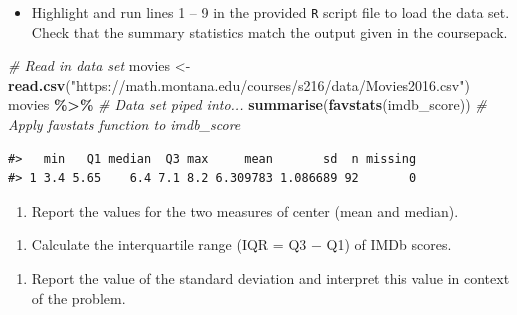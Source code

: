 \documentclass[
]{report}
\newenvironment{Shaded}{\begin{snugshade}}{\end{snugshade}}
\newcommand{\CommentTok}[1]{\textcolor[rgb]{0.56,0.35,0.01}{\textit{#1}}}
\newcommand{\FunctionTok}[1]{\textcolor[rgb]{0.13,0.29,0.53}{\textbf{#1}}}
\newcommand{\NormalTok}[1]{#1}
\newcommand{\OtherTok}[1]{\textcolor[rgb]{0.56,0.35,0.01}{#1}}
\newcommand{\SpecialCharTok}[1]{\textcolor[rgb]{0.81,0.36,0.00}{\textbf{#1}}}
\newcommand{\StringTok}[1]{\textcolor[rgb]{0.31,0.60,0.02}{#1}}
\providecommand{\tightlist}{%
  \setlength{\itemsep}{0pt}\setlength{\parskip}{0pt}}
\begin{document}
\begin{itemize}
\tightlist
\item
  Highlight and run lines 1 -- 9 in the provided \texttt{R} script file to load the data set. Check that the summary statistics match the output given in the coursepack.
\end{itemize}

\begin{Shaded}
\begin{Highlighting}[]
\CommentTok{\# Read in data set}
\NormalTok{movies }\OtherTok{\textless{}{-}} \FunctionTok{read.csv}\NormalTok{(}\StringTok{"https://math.montana.edu/courses/s216/data/Movies2016.csv"}\NormalTok{) }
\NormalTok{movies }\SpecialCharTok{\%\textgreater{}\%} \CommentTok{\# Data set piped into...}
  \FunctionTok{summarise}\NormalTok{(}\FunctionTok{favstats}\NormalTok{(imdb\_score)) }\CommentTok{\# Apply favstats function to imdb\_score}
\end{Highlighting}
\end{Shaded}

\begin{verbatim}
#>   min   Q1 median  Q3 max     mean       sd  n missing
#> 1 3.4 5.65    6.4 7.1 8.2 6.309783 1.086689 92       0
\end{verbatim}

\begin{enumerate}
\def\labelenumi{\arabic{enumi}.}
\tightlist
\item
  Report the values for the two measures of center (mean and median).
\end{enumerate}

\vspace{0.5in}

\begin{enumerate}
\def\labelenumi{\arabic{enumi}.}
\setcounter{enumi}{1}
\tightlist
\item
  Calculate the interquartile range (IQR = Q3 \(-\) Q1) of IMDb scores.
\end{enumerate}

\vspace{0.5in}

\begin{enumerate}
\def\labelenumi{\arabic{enumi}.}
\setcounter{enumi}{2}
\tightlist
\item
  Report the value of the standard deviation and interpret this value in context of the problem.
  \vspace{0.8in}
\end{enumerate}
\end{document}

